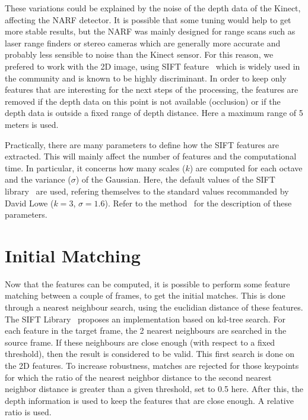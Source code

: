 These variations could be explained by the noise of the depth data of the Kinect, affecting the \gls{NARF} detector. It is possible that some tuning would help to get more stable results, but the \gls{NARF} was mainly designed for range scans such as laser range finders or stereo cameras which are generally more accurate and probably less sensible to noise than the Kinect sensor. For this reason, we prefered to work with the 2D image, using \gls{SIFT} feature~\cite{lowe_2004_sift} which is widely used in the community and is known to be highly discriminant. In order to keep only features that are interesting for the next steps of the processing, the features are removed if the depth data on this point is not available (occlusion) or if the depth data is outside a fixed range of depth distance. Here a maximum range of 5 meters is used.

Practically, there are many parameters to define how the \gls{SIFT} features are extracted. This will mainly affect the number of features and the computational time. In particular, it concerns how many scales ($k$) are computed for each octave and the variance ($\sigma$) of the Gaussian. Here, the default values of the \gls{SIFT} library~\cite{hess_sift} are used, refering themselves to the standard values recommanded by David Lowe ($k=3$, $\sigma=1.6$). Refer to the method~\cite{lowe_2004_sift} for the description of these parameters.

\section{Initial Matching}

Now that the features can be computed, it is possible to perform some feature matching between a couple of frames, to get the initial matches. This is done through a nearest neighbour search, using the euclidian distance of these features.  
The \gls{SIFT} Library~\cite{hess_sift} proposes an implementation based on kd-tree search. For each feature in the target frame, the 2 nearest neighbours are searched in the source frame. If these neighbours are close enough (with respect to a fixed threshold), then the result is considered to be valid. This first search is done on the 2D features. To increase robustness, matches are rejected for those keypoints for which the ratio of the nearest neighbor distance to the second nearest neighbor distance is greater than a given threshold, set to 0.5 here. 
After this, the depth information is used to keep the features that are close enough. A relative ratio is used.

